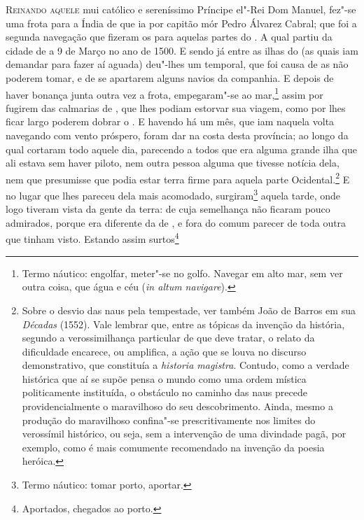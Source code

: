 \noindent\textsc{Reinando aquele} mui católico e sereníssimo Príncipe el"-Rei Dom Manuel,     
fez"-se uma frota para a Índia de que ia por capitão mór Pedro Álvarez Cabral; 	        %
que foi a segunda navegação que fizeram os  para
aquelas partes do . A qual partiu da cidade de  a 9 de Março no
ano de 1500. E sendo já entre as ilhas do  (as quais iam
demandar para fazer aí aguada) deu"-lhes um temporal, que foi				%
causa de as não poderem tomar, e de se apartarem alguns navios da
companhia. E depois de haver bonança junta outra vez a frota,					
empegaram"-se ao mar,\footnote{ Termo náutico: engolfar,  meter"-se no
golfo. Navegar em alto mar, sem ver outra coisa, que água e céu
(\textit{in altum navigare}).} assim por fugirem das calmarias de ,		%
que lhes podiam estorvar sua viagem, como por lhes ficar largo poderem
dobrar o . E havendo há um mês, que iam naquela
volta navegando com vento próspero, foram dar na costa desta província;				%
ao longo da qual cortaram todo aquele dia, parecendo a todos que era
alguma grande ilha que ali estava sem haver piloto, nem outra pessoa
alguma que tivesse notícia dela, nem que presumisse que podia estar
terra firme para aquela parte Ocidental.\footnote{ Sobre o desvio das				%
naus pela tempestade, ver também João de Barros em sua \textit{Décadas}
(1552). Vale lembrar que, entre as tópicas da invenção da história,
segundo a verossimilhança particular de que deve tratar, o relato da
dificuldade encarece, ou amplifica, a ação que se louva no discurso
demonstrativo, que constituía a \textit{historia
magistra}. Contudo, como a verdade histórica que aí se supõe pensa o
mundo como uma ordem mística politicamente instituída, o obstáculo no
caminho das naus precede providencialmente o maravilhoso do seu
descobrimento. Ainda, mesmo a produção do maravilhoso confina"-se
prescritivamente nos limites do verossímil histórico, ou seja, sem a
intervenção de uma divindade pagã, por exemplo, como é mais comumente
recomendado na invenção da poesia heróica.} E no lugar que lhes pareceu
dela mais acomodado, surgiram\footnote{ Termo náutico: tomar porto,
aportar. } aquela tarde, onde logo tiveram vista da gente da terra: de
cuja semelhança não ficaram pouco admirados, porque era diferente da de
, e fora do comum parecer de toda outra que tinham visto.
Estando assim surtos\footnote{ Aportados, chegados ao porto.}
